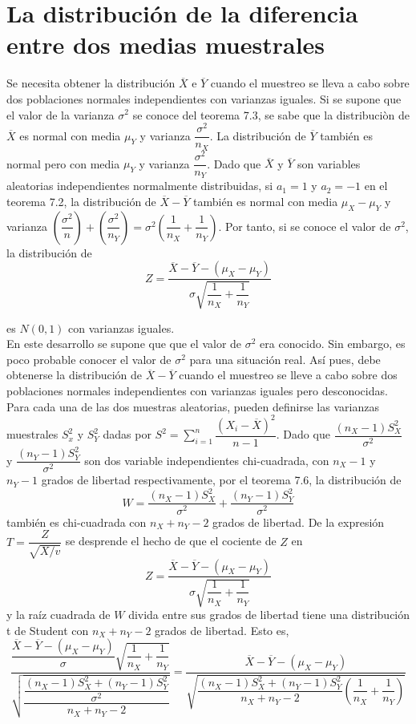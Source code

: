 \section{La distribución de la diferencia entre dos medias muestrales}
Se necesita obtener la distribución $\overline{X}$ e $\overline{Y}$ cuando el muestreo se lleva a cabo sobre dos poblaciones normales independientes con varianzas iguales. Si se supone que el valor de la varianza $\sigma^2$ se conoce del teorema 7.3, se sabe que la distribuciòn de $\overline{X}$ es normal con media $\mu_{Y}$ y varianza $\dfrac{\sigma^2}{n_X}$. La distribución de $\overline{Y}$ también es normal pero con media $\mu_Y$ y varianza $\dfrac{\sigma^2}{n_Y}$. Dado que $\overline{X}$ y $\overline{Y}$ son variables aleatorias independientes normalmente distribuidas, si $a_1=1$ y $a_2=-1$ en el teorema 7.2, la distribución de $\overline{X}-\overline{Y}$ también es normal con media $\mu_X-\mu_Y$ y varianza $\left(\dfrac{\sigma^2}{n}\right)+\left(\dfrac{\sigma^2}{n_Y}\right)=\sigma^2\left(\dfrac{1}{n_X}+\dfrac{1}{n_Y}\right)$. Por tanto, si se conoce el valor de $\sigma^2$, la distribución de 
$$Z=\dfrac{\overline{X}-\overline{Y}-\left(\mu_X-\mu_Y\right)}{\sigma\sqrt{\dfrac{1}{n_X}+\dfrac{1}{n_Y}}}$$

es $N(0,1)$ con varianzas iguales.\\

En este desarrollo se supone que que el valor de $\sigma^2$ era conocido. Sin embargo, es poco probable conocer el valor de $\sigma^2$ para una situación real. Así pues, debe obtenerse la distribución de $\overline{X}-\overline{Y}$ cuando el muestreo se lleve a cabo sobre dos poblaciones normales independientes con varianzas iguales pero desconocidas. Para cada una de las dos muestras aleatorias, pueden definirse las varianzas muestrales $S_x^2$ y $S_Y^2$ dadas por $S^2=\sum\limits_{i=1}^n\dfrac{\left(X_i-\overline{X}\right)^2}{n-1}$. Dado que $\dfrac{(n_X-1)S_X^2}{\sigma^2}$ y $\dfrac{\left(n_Y-1\right)S_Y^2}{\sigma^2}$ son dos variable independientes chi-cuadrada, con $n_X-1$ y $n_Y-1$ grados de libertad respectivamente, por el teorema 7.6, la distribución de 
$$W=\dfrac{(n_X-1)S_X^2}{\sigma^2}+\dfrac{(n_Y-1)S_Y^2}{\sigma^2}$$
también es chi-cuadrada con $n_X+n_Y-2$ grados de libertad. De la expresión $T=\dfrac{Z}{\sqrt{X/v}}$ se desprende el hecho de que el cociente de $Z$ en 
$$Z=\dfrac{\overline{X}-\overline{Y}-\left(\mu_X-\mu_Y\right)}{\sigma\sqrt{\dfrac{1}{n_X}+\dfrac{1}{n_Y}}}$$
y la raíz cuadrada de $W$ divida entre sus grados de libertad tiene una distribución t de Student con $n_X+n_Y-2$ grados de libertad. Esto es,
$$\dfrac{\dfrac{\overline{X}-\overline{Y}-\left(\mu_X-\mu_Y\right)}{\sigma}\sqrt{\dfrac{1}{n_X}+\dfrac{1}{n_Y}}}{\sqrt{\dfrac{\dfrac{\left(n_X-1\right)S_X^2+\left(n_Y-1\right)S_Y^2}{\sigma^2}}{n_X+n_Y-2}}}=\dfrac{\overline{X}-\overline{Y}-\left(\mu_X-\mu_Y\right)}{\sqrt{\dfrac{\left(n_X-1\right)S_X^2+\left(n_Y-1\right)S_Y^2}{n_X+n_Y-2}\left(\dfrac{1}{n_X}+\dfrac{1}{n_Y}\right)}}$$

